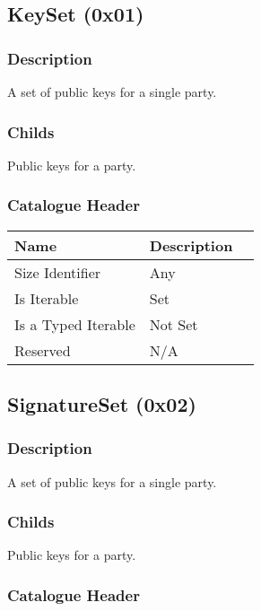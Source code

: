 \documentclass[11pt]{article}
\begin{document}

\subsection{KeySet (0x01)}
\subsubsection{Description}
A set of public keys for a single party.

\subsubsection{Childs}
Public keys for a party.

\subsubsection{Catalogue Header}

\begin{center}
\begin{tabular}{ |l|l|l| } 
\hline
\textbf{Name} & \textbf{Description}\\
\hline
Size Identifier & Any \\
Is Iterable & Set \\
Is a Typed Iterable & Not Set \\   
Reserved & N/A \\ 
\hline
\end{tabular}
\end{center}


\subsection{SignatureSet (0x02)}
\subsubsection{Description}
A set of public keys for a single party.

\subsubsection{Childs}
Public keys for a party.

\subsubsection{Catalogue Header}
\end{document}
